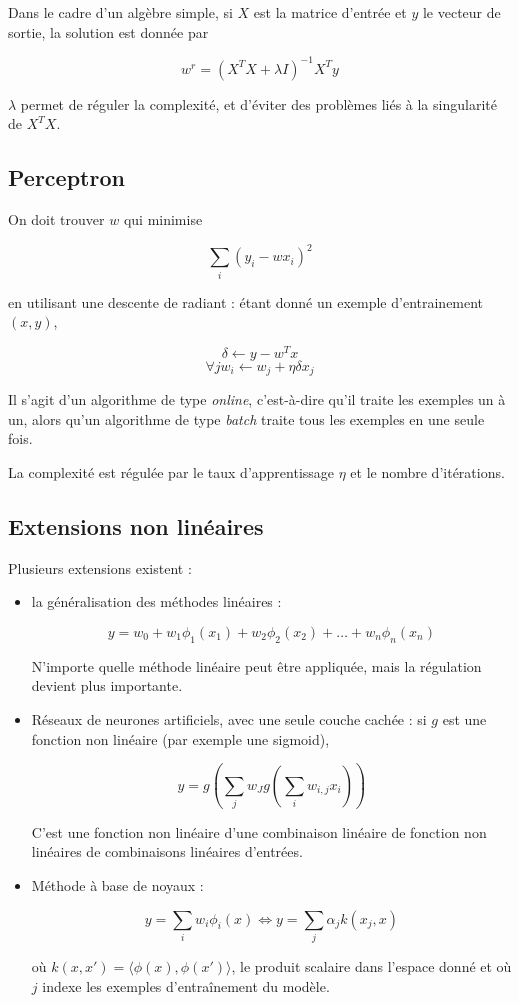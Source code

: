 		Dans le cadre d'un algèbre simple, si $X$ est la matrice d'entrée et $y$ le vecteur de sortie, la solution est donnée par
	
		$$w^r = (X^T X + \lambda I)^{-1}X^Ty$$
	
		$\lambda$ permet de réguler la complexité, et d'éviter des problèmes liés à la singularité de $X^TX$.
	
		\subsection{Perceptron}
	
		On doit trouver $w$ qui minimise
	
		$$\sum_i (y_i - wx_i)^2$$
	
		en utilisant une descente de radiant : étant donné un exemple d'entrainement $(x, y)$,
	
		$$\delta \leftarrow y - w^Tx$$
		$$\forall jw_i \leftarrow w_j + \eta \delta x_j$$
	
		Il s'agit d'un algorithme de type \textit{online}, c'est-à-dire qu'il traite les exemples un à un, alors qu'un algorithme de type \textit{batch} traite tous les exemples en une seule fois.
	
		La complexité est régulée par le taux d'apprentissage $\eta$ et le nombre d'itérations.
	
		\subsection{Extensions non linéaires}
	
		Plusieurs extensions existent :
	
		\begin{itemize}
			\item la généralisation des méthodes linéaires :
		
			$$y = w_0 + w_1 \phi_1(x_1) + w_2 \phi_2(x_2) + \dots + w_n \phi_n(x_n)$$
		
			N'importe quelle méthode linéaire peut être appliquée, mais la régulation devient plus importante.
		
			\item Réseaux de neurones artificiels, avec une seule couche cachée : si $g$ est une fonction non linéaire (par exemple une sigmoid),
		
			$$y = g(\sum_j w_J g(\sum_i w_{i, j} x_i))$$
		
			C'est une fonction non linéaire d'une combinaison linéaire de fonction non linéaires de combinaisons linéaires d'entrées.
		
			\item Méthode à base de noyaux :
		
			$$y = \sum_i w_i \phi_i(x) \Leftrightarrow y = \sum_j \alpha_j k(x_j, x)$$
		
			où $k(x, x') = \langle \phi(x), \phi(x') \rangle$, le produit scalaire dans l'espace donné et où $j$ indexe les exemples d'entraînement du modèle.
		\end{itemize}


